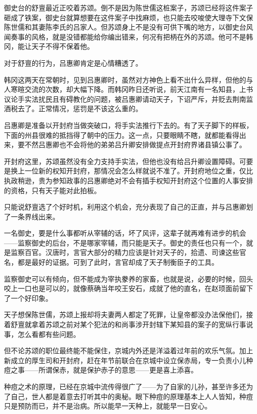 御史台的舒亶最近正咬着苏颂。倒不是因为陈世儒这桩案子，苏颂已经将这件案子砸成了铁案，御史台就算想要在这件案子中找麻烦，也只能去咬唆使大理寺下文保陈世儒和其妻陈李氏的吕家人。但苏颂身上不是没有可供下嘴的地方，以御史台风闻奏事的风格，就是没错都能给你编出错来，何况有把柄在外的苏颂。他可不是韩冈，能让天子不得不保着他。

对于舒亶的行为，吕惠卿肯定是心情糟透了。

韩冈这两天在常朝时，见到吕惠卿时，虽然对方神色上看不出什么异样，但他的与人寒暄交流的次数，却大幅下降。而韩冈昨日还听说，前天江南有一名知县，上书议论手实法扰民且有碍教化的问题，被吕惠卿请动天子，下诏严斥，并贬去荆南监酒税去了。正常情况，惩罚是不该这么重的。

吕惠卿是准备以开封府当做突破口，将手实法推行下去的。有了天子脚下的样板，下面的州县很难的抵挡得了朝中的压力。这一点，只要眼睛不瞎，就都能看得出来，要不然吕惠卿也不会将他的弟弟吕升卿安排做提点开封府界诸县镇公事了。

开封府这里，苏颂虽然没有全力支持手实法，但他也没有给吕升卿设置障碍。可要是换上一位新的权知开封府，那情况会怎么样就说不准了。开封府地位之重，仅比执政稍逊，贵为参知政事的吕惠卿绝对不会有插手权知开封府这个位置的人事安排的资格，只有天子能对此拍板。

只能说舒亶选了个好时机，利用这个机会，充分表现了自己的正直，并与吕惠卿划了一条界线出来。

一名御史，要是什么事都听从宰辅的话，坏了风评，这辈子就再难有进步的机会——监察御史的后台，不是哪家宰辅，而只能是天子。御史的责任也只有一个，就是监察百官。汉唐时，言官大部分的精力应该是针对天子的，拾遗、司谏这些官名，都是最好的证据。可到了此时，言官却成了天子制衡臣子的工具。

监察御史可以有倾向，但不能成为宰执豢养的家畜，也就是说，必要的时候，回头咬上一口也是可以的，就像蔡确当年咬王安石，成就了他的直名，在赵顼面前留下了一个好印象。

天子想保陈世儒，苏颂上报却将夫妻两人都定了死罪，让皇帝都没办法保他们，接着舒亶就拿着苏颂之前对某个犯法的和尚事涉开封辖下某知县的案子的宽纵行事说事，怎么看都有些问题。

但不论苏颂的职位最终能不能保住，京城内外还是洋溢着过年前的欢乐气氛。加上新成立的厚生司和开封府，赶在年节前联合在京城中设立保赤局，专一负责小儿种痘之事——所谓保赤，就是保护赤子的意思——更是喜上添喜。

种痘之术的原理，已经在京城中流传得很广了——为了自家的儿孙，甚至许多还为了自己，世人都是着意去打听其中的奥秘。眼下种痘的原理基本上人人皆知，种痘只是预防而已，并不是治病。所以能早一天种上，就能早一日安心。

